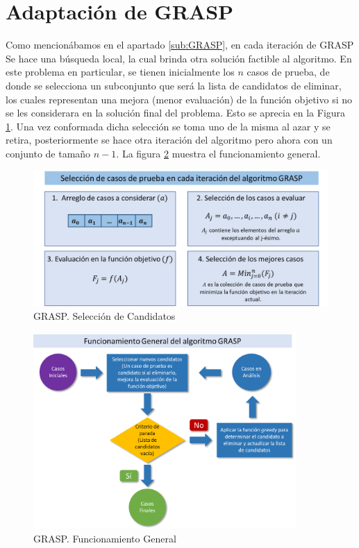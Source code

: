 \documentclass[a4paper,openright,11pt,oneside]{book}
\begin{document}
	\section{Adaptación de GRASP}
		Como mencionábamos en el apartado \ref{sub:GRASP}, en cada iteración de GRASP Se hace una búsqueda local, la cual brinda otra solución factible al algoritmo. En este problema en particular, se tienen inicialmente los $n$ casos de prueba, de donde se selecciona un subconjunto que será la lista de candidatos de eliminar, los cuales representan una mejora (menor evaluación) de la función objetivo si no se les considerara en la solución final del problema. Esto se aprecia en la Figura \ref{GRASP. Candidatos}. Una vez conformada dicha selección se toma uno de la misma al azar y se retira, posteriormente se hace otra iteración del algoritmo pero ahora con un conjunto de tamaño $n-1$. La figura \ref{GRASP. General} muestra el funcionamiento general.
		
		\begin{figure}[!]
			\centering
			\includegraphics[width=12cm]{./Graphics/FiltrodeGRASP1.png}
			\caption{GRASP. Selección de Candidatos}
			\label{GRASP. Candidatos}
		\end{figure}
	
		\begin{figure}[!]
			\centering
			\includegraphics[width=10cm]{./Graphics/GraficoGRASP1.png}
			\caption{GRASP. Funcionamiento General}
			\label{GRASP. General}
		\end{figure}
		
\end{document}
